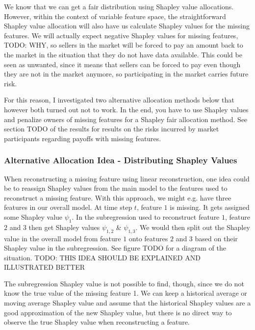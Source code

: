 We know that we can get a fair distribution using Shapley value allocations.
However, within the context of variable feature space, the straightforward
Shapley value allocation will also have us calculate Shapley values for the
missing features. We will actually expect negative Shapley values for missing
features, TODO: WHY, so sellers in the market will be forced to pay an amount
back to the market in the situation that they do not have data available. This
could be seen as unwanted, since it means that sellers can be forced to pay
even though they are not in the market anymore, so participating in the market
carries future risk.

For this reason, I investigated two alternative allocation methods below that
however both turned out not to work. In the end, you have to use Shapley values
and penalize owners of missing features for a Shapley fair allocation method.
See section TODO of the results for results on the risks incurred by market
participants regarding payoffs with missing features.


\subsubsection{Alternative Allocation Idea - Distributing Shapley Values}

When reconstructing a missing feature using linear reconstruction, one idea
could be to reassign Shapley values from the main model to the features used to
reconstruct a missing feature. With this approach, we might e.g. have three
features in our overall model. At time step $t$, feature $1$ is missing. It
gets assigned some Shapley value $\psi_1$. In the subregression used to
reconstruct feature $1$, feature $2$ and $3$ then get Shapley values
$\psi_{1,2}$ \& $\psi_{1,3}$. We would then split out the Shapley value in the
overall model from feature $1$ onto features $2$ and $3$ based on their Shapley
value in the subregression. See figure TODO for a diagram of the situation.
TODO: THIS IDEA SHOULD BE EXPLAINED AND ILLUSTRATED BETTER

The subregression Shapley value is not possible to find, though, since we do
not know the true value of the missing feature 1. We can keep a historical
average or moving average Shapley value and assume that the historical Shapley
values are a good approximation of the new Shapley value, but there is no
direct way to observe the true Shapley value when reconstructing a feature.

